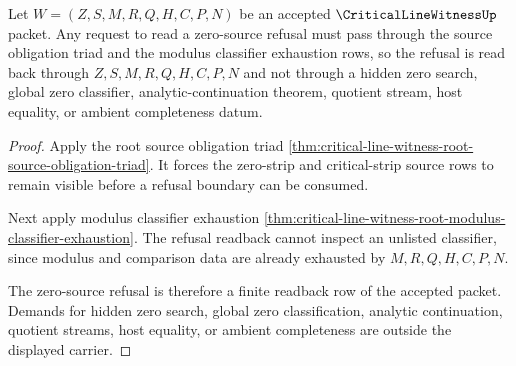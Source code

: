 \begin{theorem}
\label{thm:critical-line-witness-zero-source-refusal-readback}
Let $W=(Z,S,M,R,Q,H,C,P,N)$ be an accepted $\CriticalLineWitnessUp$ packet. Any request to read a zero-source refusal must pass through the source obligation triad and the modulus classifier exhaustion rows, so the refusal is read back through $Z,S,M,R,Q,H,C,P,N$ and not through a hidden zero search, global zero classifier, analytic-continuation theorem, quotient stream, host equality, or ambient completeness datum.
\end{theorem}
\begin{proof}
Apply the root source obligation triad \autoref{thm:critical-line-witness-root-source-obligation-triad}. It forces the zero-strip and critical-strip source rows to remain visible before a refusal boundary can be consumed.

Next apply modulus classifier exhaustion \autoref{thm:critical-line-witness-root-modulus-classifier-exhaustion}. The refusal readback cannot inspect an unlisted classifier, since modulus and comparison data are already exhausted by $M,R,Q,H,C,P,N$.

The zero-source refusal is therefore a finite readback row of the accepted packet. Demands for hidden zero search, global zero classification, analytic continuation, quotient streams, host equality, or ambient completeness are outside the displayed carrier.
\end{proof}

